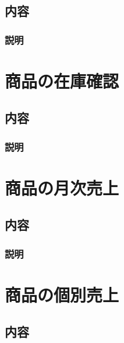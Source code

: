 \documentclass[letterpaper,10pt,dvipdfmx]{sphinxmanual}
\begin{document}
\section{内容}
\label{\detokenize{trader/destroy:id2}}

\subsection{説明}
\label{\detokenize{trader/destroy:id3}}

\chapter{商品の在庫確認}
\label{\detokenize{trader/index::doc}}\label{\detokenize{trader/index:id1}}

\section{内容}
\label{\detokenize{trader/index:id2}}

\subsection{説明}
\label{\detokenize{trader/index:id3}}

\chapter{商品の月次売上}
\label{\detokenize{trader/monthly_sales::doc}}\label{\detokenize{trader/monthly_sales:id1}}

\section{内容}
\label{\detokenize{trader/monthly_sales:id2}}

\subsection{説明}
\label{\detokenize{trader/monthly_sales:id3}}

\chapter{商品の個別売上}
\label{\detokenize{trader/indivisual_sales::doc}}\label{\detokenize{trader/indivisual_sales:id1}}

\section{内容}
\label{\detokenize{trader/indivisual_sales:id2}}
\end{document}
